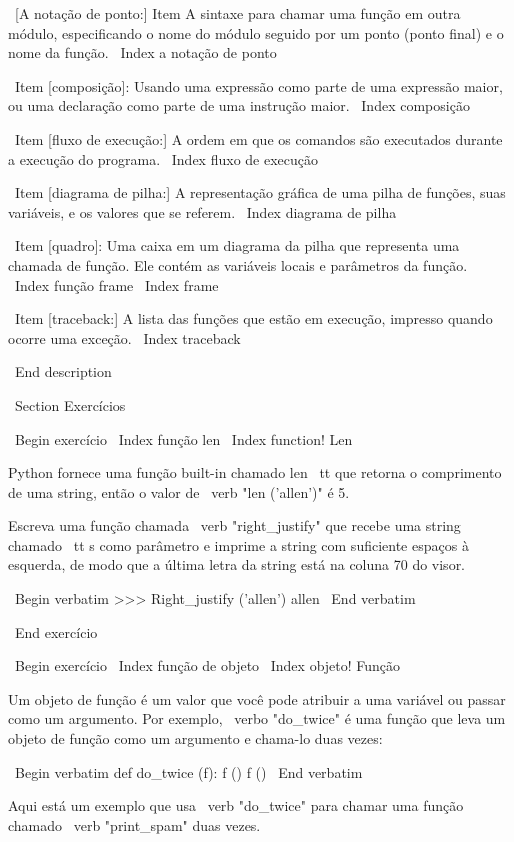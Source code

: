 \documentclass[10pt]{book}
\begin{document}
{\ [A notação de ponto:] Item A sintaxe para chamar uma função em outra
módulo, especificando o nome do módulo seguido por um ponto (ponto final) e
o nome da função.
\ Index {} a notação de ponto

\ Item [composição]: Usando uma expressão como parte de uma expressão maior,
ou uma declaração como parte de uma instrução maior.
\ Index {composição}

\ Item [fluxo de execução:] A ordem em que os comandos são executados durante
a execução do programa.
\ Index {fluxo de execução}

\ Item [diagrama de pilha:] A representação gráfica de uma pilha de funções,
suas variáveis, e os valores que se referem.
\ Index {diagrama de pilha}

\ Item [quadro]: Uma caixa em um diagrama da pilha que representa uma chamada de função.
Ele contém as variáveis ​​locais e parâmetros da função.
\ Index {função frame}
\ Index {frame}

\ Item [traceback:] A lista das funções que estão em execução,
impresso quando ocorre uma exceção.
\ Index {} traceback


\ End {description}


\ Section {Exercícios}

\ Begin {} exercício
\ Index {função len}
\ Index {function! Len}

Python fornece uma função built-in chamado {len \ tt} que
retorna o comprimento de uma string, então o valor de \ verb "len ('allen')" é 5.

Escreva uma função chamada \ verb "right_justify" que recebe uma string
chamado {\ tt s} como parâmetro e imprime a string com suficiente
espaços à esquerda, de modo que a última letra da string está na coluna 70
do visor.

\ Begin {verbatim}
>>> Right_justify ('allen')
                                                                 allen
\ End {verbatim}

\ End {} exercício


\ Begin {} exercício
\ Index {função de objeto}
\ Index {objeto! Função}

Um objeto de função é um valor que você pode atribuir a uma variável
ou passar como um argumento. Por exemplo, \ verbo "do_twice" é uma função
que leva um objeto de função como um argumento e chama-lo duas vezes:

\ Begin {verbatim}
def do_twice (f):
    f ()
    f ()
\ End {verbatim}

Aqui está um exemplo que usa \ verb "do_twice" para chamar uma função
chamado \ verb "print_spam" duas vezes.

}
\end{document}
